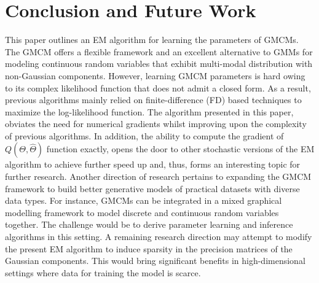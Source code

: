 \documentclass[]{article}
\begin{document}
\section{Conclusion and Future Work}\label{sec:Conclusion&FutureWork}
This paper outlines an EM algorithm for learning the parameters of GMCMs. The GMCM offers a flexible framework and an excellent alternative to GMMs for modeling continuous random variables that exhibit multi-modal distribution with non-Gaussian components. However, learning GMCM parameters is hard owing to its complex likelihood function that does not admit a closed form. As a result, previous algorithms mainly relied on finite-difference (FD) based techniques to maximize the log-likelihood function. The algorithm presented in this paper, obviates the need for numerical gradients whilst improving upon the complexity of previous algorithms. In addition, the ability to compute the gradient of $Q(\Theta,\hat{\Theta})$ function exactly, opens the door to other stochastic versions of the EM algorithm to achieve further speed up and, thus, forms an interesting topic for further research. Another direction of research pertains to expanding the GMCM framework to build better generative models of practical datasets with diverse data types. For instance, GMCMs can be integrated in a mixed graphical modelling framework to model discrete and continuous random variables together. The challenge would be to derive parameter learning and inference algorithms in this setting. A remaining research direction may attempt to modify the present EM algorithm to induce sparsity in the precision matrices of the Gaussian components. This would bring significant benefits in high-dimensional settings where data for training the model is scarce. 


{}
\end{document}
